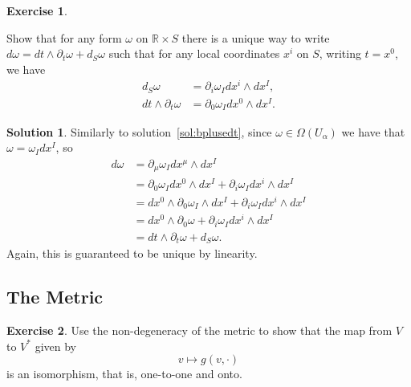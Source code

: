 \documentclass[11pt, a4paper]{article}
\theoremstyle{definition}
\newtheorem{ex}{Exercise}[part]
\newtheorem{sol}{Solution}[part]
\begin{document}
\begin{ex}\label{ex:pformspaceandtime}

Show that for any form $\omega$ on $\mathbb{R} \times S$ there is a unique way to write $d\omega = dt \wedge \partial_t \omega + d_S \omega$ such that for any local coordinates $x^i$ on $S$, writing $t = x^0$, we have
\begin{align*}
    d_S\omega &= \partial_i \omega_I dx^i \wedge dx^I, \\
    dt \wedge \partial_t \omega &= \partial_0 \omega_I dx^0 \wedge dx^I.
\end{align*}

\end{ex}

\begin{sol}

Similarly to solution~\ref{sol:bplusedt}, since $\omega \in \Omega(U_\alpha)$ we have that $\omega = \omega_I dx^I$, so
\begin{align*}
    d\omega &= \partial_\mu \omega_I dx^\mu \wedge dx^I \\
        &= \partial_0 \omega_I dx^0 \wedge dx^I + \partial_i \omega_I dx^i \wedge dx^I \\
        &= dx^0 \wedge \partial_0 \omega_I \wedge dx^I + \partial_i \omega_I dx^i \wedge dx^I \\
        &= dx^0 \wedge \partial_0 \omega + \partial_i \omega_I dx^i \wedge dx^I \\
        &= dt \wedge \partial_t \omega + d_S \omega.
\end{align*}
Again, this is guaranteed to be unique by linearity.

\end{sol}

\subsection{The Metric}

\begin{ex}

Use the non-degeneracy of the metric to show that the map from $V$ to $V^*$ given by
\[
    v \mapsto g(v, \cdot)
\]
is an isomorphism, that is, one-to-one and onto.

\end{ex}
\end{document}
